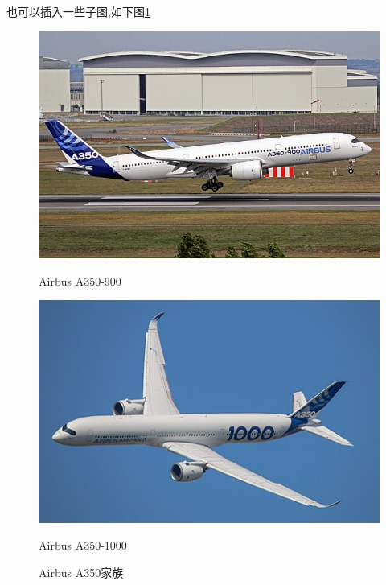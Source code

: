 也可以插入一些子图,如下图\ref{fig:A350} 
\begin{figure}[!ht]
    \centering 
    \begin{subcaptionblock}{0.48\textwidth}
        \centering 
        \includegraphics[width=\linewidth]{./figure/A359.jpg}
        \caption{Airbus A350-900}
        \label{fig:A359}
    \end{subcaptionblock}
    \begin{subcaptionblock}{0.48\textwidth}
        \centering
        \includegraphics[width=\linewidth]{./figure/A35k.jpg}
        \caption{Airbus A350-1000}
        \label{fig:A35k}
    \end{subcaptionblock}
    \caption{Airbus A350家族}
    \label{fig:A350}
\end{figure}

